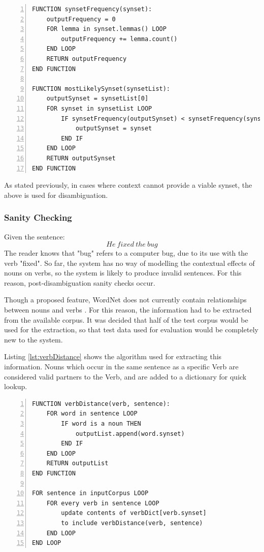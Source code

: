 \documentclass[]{article}
\begin{document}
\begin{lstlisting}[numbers=left, numberstyle=\small, caption={The synsetFrequency and mostLikelySynset functions}, captionpos=b, label={lst:synsetFrequency}]
FUNCTION synsetFrequency(synset):
    outputFrequency = 0
    FOR lemma in synset.lemmas() LOOP
        outputFrequency += lemma.count()
    END LOOP
    RETURN outputFrequency
END FUNCTION

FUNCTION mostLikelySynset(synsetList):
    outputSynset = synsetList[0]
    FOR synset in synsetList LOOP
        IF synsetFrequency(outputSynset) < synsetFrequency(synset) THEN
            outputSynset = synset
        END IF
    END LOOP
    RETURN outputSynset
END FUNCTION
\end{lstlisting}

As stated previously, in cases where context cannot provide a viable synset, the above is used for disambiguation.

\subsubsection{Sanity Checking}
\label{sec:Sanity}
Given the sentence:
\[He\: fixed\: the\: bug\]
The reader knows that "bug" refers to a computer bug, due to its use with the verb "fixed". So far, the system has no way of modelling the contextual effects of nouns on verbs, so the system is likely to produce invalid sentences. For this reason, post-disambiguation sanity checks occur.

Though a proposed feature, WordNet does not currently contain relationships between nouns and verbs \cite{WN4Verbs}. For this reason, the information had to be extracted from the available corpus. It was decided that half of the test corpus would be used for the extraction, so that test data used for evaluation would be completely new to the system.

Listing \ref{lst:verbDistance} shows the algorithm used for extracting this information. Nouns which occur in the same sentence as a specific Verb are considered valid partners to the Verb, and are added to a dictionary for quick lookup.

\begin{lstlisting}[numbers=left, numberstyle=\small, caption={The noun-verb relationship learning algorithm}, captionpos=b, label={lst:verbDistance}]
FUNCTION verbDistance(verb, sentence):
	FOR word in sentence LOOP
		IF word is a noun THEN
			outputList.append(word.synset)
		END IF
	END LOOP
	RETURN outputList
END FUNCTION			

FOR sentence in inputCorpus LOOP
	FOR every verb in sentence LOOP
		update contents of verbDict[verb.synset] 
		to include verbDistance(verb, sentence)
	END LOOP
END LOOP
\end{lstlisting}
\end{document}

